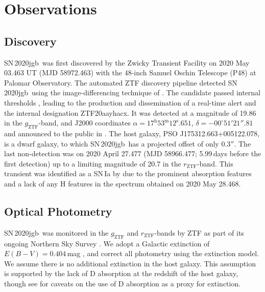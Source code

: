 \documentclass[twocolumn]{aastex631}
\newcommand{\sn}{SN\,2020jgb}
\newcommand{\chang}[1]{\textcolor{blue}{[Chang: #1]}}
\begin{document}
\section{Observations} \label{sec:obs}
\subsection{Discovery}


\sn\ was first discovered by the Zwicky Transient Facility \citep[ZTF;][]{ZTF2019a,ZTF2019b} on 2020 May 03.463 UT (MJD 58972.463) with the 48-inch Samuel Oschin Telescope (P48) at Palomar Observatory. The automated ZTF discovery pipeline \citep{Masci_2019} detected \sn\ using the image-differencing technique of \citet{Zackay_imagesub_2016}. The candidate passed internal thresholds \citep[e.g.,][]{Mahabal_ZTFML_2019, Duev_ZTFML_2019}, leading to the production and dissemination of a real-time alert \citep{Patterson_ZTFalert_2019} and the internal designation ZTF20aayhacx. It was detected at a magnitude of 19.86 in the $g_\mathrm{ZTF}$-band, and J2000 coordinates $\alpha=17^\mathrm{h}53^\mathrm{m}12^\mathrm{s}.651$, $\delta=-00^\circ51'21''.81$ and announced to the public in \citet{Fremling_report_2020}. The host galaxy, PSO J175312.663+005122.078, is a dwarf galaxy, to which \sn\ has a projected offset of only $0.3''$. The last non-detection was on 2020 April 27.477 (MJD 58966.477; 5.99\,days before the first detection) up to a limiting magnitude of 20.7 in the $r_\mathrm{ZTF}$-band. This transient was identified as a SN\,Ia by \citet{TNS_2020} due to the prominent  absorption features and a lack of any H features in the spectrum obtained on 2020 May 28.468.

\subsection{Optical Photometry}
\sn\ was monitored in the $g_\mathrm{ZTF}$ and $r_\mathrm{ZTF}$-bands by ZTF as part of its ongoing Northern Sky Survey \citep{ZTF2019a}. %
We adopt a Galactic extinction of $E(B-V)=0.404\,$mag \citep{Schlafly2011}, and correct all photometry using the \citet{Fitzpatrick1999} extinction model. We assume there is no additional extinction in the host galaxy. This assumption is supported by the lack of  D absorption at the redshift of the host galaxy, though see \citet{Poznanski_2011} for caveats on the use of  D absorption as a proxy for extinction. 
\end{document}
